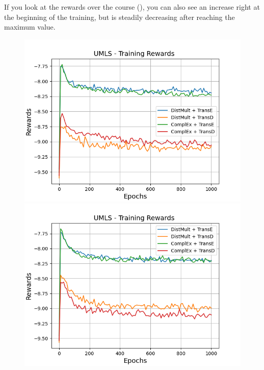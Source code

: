 If you look at the rewards over the course (), you can also see an increase right at the beginning of the training, but is steadily decreasing after reaching the maximum value.
\begin{figure}[H]
    \centering
    \begin{minipage}{.5\textwidth}
      \centering
      \includegraphics[width=0.9\linewidth]{figures/results/gan_train/not_pretrained/uncertainty/max_distribution/entropy/umls/1k_epochs/uncertainty_umls_rew.png}
    \end{minipage}%
    \begin{minipage}{.5\textwidth}
      \centering
      \includegraphics[width=0.9\linewidth]{figures/results/gan_train/not_pretrained/uncertainty/max_distribution/least_confidence/umls/uncertainty_umls_rew.png}
    \end{minipage}

\end{figure}
